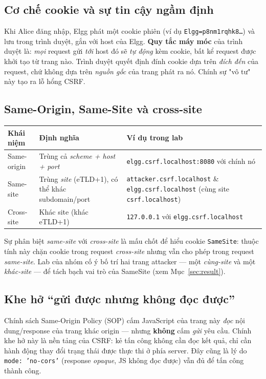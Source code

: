 \documentclass[11pt,a4paper]{article}
\begin{document}
\subsection{Cơ chế cookie và sự tin cậy ngầm định}
Khi Alice đăng nhập, Elgg phát một cookie phiên (ví dụ \texttt{Elgg=p8nm1rqhk8\ldots}) và lưu trong trình duyệt, gắn với host của Elgg. \textbf{Quy tắc máy móc} của trình duyệt là: \emph{mọi} request gửi \emph{tới} host đó sẽ \emph{tự động} kèm cookie, bất kể request được khởi tạo từ trang nào. Trình duyệt quyết định đính cookie dựa trên \emph{đích đến} của request, chứ không dựa trên \emph{nguồn gốc} của trang phát ra nó. Chính sự "vô tư" này tạo ra lỗ hổng CSRF.

\subsection{Same-Origin, Same-Site và cross-site}
\begin{center}\small
\begin{tabularx}{\linewidth}{@{}l Y Y@{}}
\toprule
\textbf{Khái niệm} & \textbf{Định nghĩa} & \textbf{Ví dụ trong lab}\\
\midrule
Same-origin & Trùng cả \emph{scheme + host + port} & \texttt{elgg.csrf.localhost:8080} với chính nó\\
Same-site & Trùng \emph{site} (eTLD+1), có thể khác subdomain/port & \texttt{attacker.csrf.localhost} \& \texttt{elgg.csrf.localhost} (cùng site \texttt{csrf.localhost})\\
Cross-site & Khác site (khác eTLD+1) & \texttt{127.0.0.1} với \texttt{elgg.csrf.localhost}\\
\bottomrule
\end{tabularx}
\end{center}
\noindent Sự phân biệt \emph{same-site} với \emph{cross-site} là mấu chốt để hiểu cookie \texttt{SameSite}: thuộc tính này chặn cookie trong request \emph{cross-site} nhưng vẫn cho phép trong request \emph{same-site}. Lab của nhóm cố ý bố trí hai trang attacker — một \emph{cùng-site} và một \emph{khác-site} — để tách bạch vai trò của SameSite (xem Mục~\ref{sec:result}).

\subsection{Khe hở ``gửi được nhưng không đọc được''}
Chính sách Same-Origin Policy (SOP) cấm JavaScript của trang này \emph{đọc} nội dung/response của trang khác origin — nhưng \textbf{không} cấm \emph{gửi} yêu cầu. Chính khe hở này là nền tảng của CSRF: kẻ tấn công không cần đọc kết quả, chỉ cần hành động thay đổi trạng thái được thực thi ở phía server. Đây cũng là lý do \texttt{mode: 'no-cors'} (response \emph{opaque}, JS không đọc được) vẫn đủ để tấn công thành công.
\end{document}
